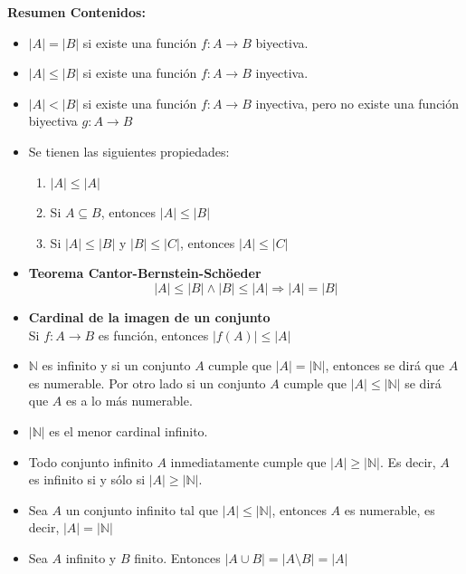 \documentclass[letterpaper,11pt]{article}
\newcommand{\N}{\mathbb N}
\theoremstyle{plain}
\begin{document}
\begin{framed} \textbf{Resumen Contenidos:}
\begin{multicols}{2}
\begin{itemize}
    \item $|A|=|B|$ si existe una función $f:A\to B$ biyectiva.
    
    \item $|A|\leq|B|$ si existe una función $f:A \to B$ inyectiva.
    
    \item $|A|<|B|$ si existe una función $f:A\to B$ inyectiva, pero no existe una función biyectiva $g:A \to B$
    
    \item Se tienen las siguientes propiedades:
        \begin{enumerate}
            \item $|A|\leq |A|$
            \item Si $A \subseteq B$, entonces $|A|\leq |B|$
            \item Si $|A|\leq |B|$ y $|B|\leq |C|$, entonces $|A|\leq |C|$
        \end{enumerate}
    
    \item \textbf{Teorema Cantor-Bernstein-Schöeder}
    $$|A|\leq |B| \land |B|\leq |A| \Rightarrow  |A|=|B|$$
    
    \item \textbf{Cardinal de la imagen de un conjunto}\\
    Si $f:A \to B$ es función, entonces $|f(A)|\leq |A|$
    
    \item $\N$ es infinito y si un conjunto $A$ cumple que $|A|=|\N|$, entonces se dirá que $A$ es numerable.
    Por otro lado si un conjunto $A$ cumple que $|A| \leq |\N|$ se dirá que $A$ es a lo más numerable.
    
    \item $|\N|$ es el menor cardinal infinito.
    
    \item Todo conjunto infinito $A$ inmediatamente cumple que $|A|\geq |\N|$. Es decir, $A$ es infinito si y sólo si $|A|\geq |\N|$.
    
    \item Sea $A$ un conjunto infinito tal que $|A|\leq |\N|$, entonces $A$ es numerable, es decir, $|A|=|\N|$
    
    \item Sea $A$ infinito y $B$ finito. Entonces $|A\cup B|=|A\setminus B|=|A|$
    

\end{itemize}
\end{multicols}
\end{framed}
\end{document}
